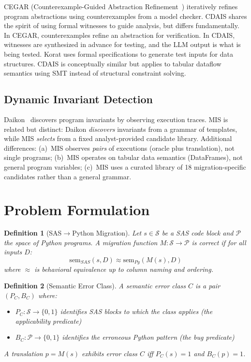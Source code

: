 \documentclass[conference]{IEEEtran}
\newtheorem{definition}{Definition}
\begin{document}
CEGAR (Counterexample-Guided Abstraction Refinement~\cite{cegar}) iteratively refines
program abstractions using counterexamples from a model checker. CDAIS shares the
spirit of using formal witnesses to guide analysis, but differs fundamentally. In
CEGAR, counterexamples refine an abstraction for verification. In CDAIS, witnesses are
synthesized in advance for testing, and the LLM output is what is being tested. Korat
\cite{korat} uses formal specifications to generate test inputs for data structures.
CDAIS is conceptually similar but applies to tabular dataflow semantics using SMT
instead of structural constraint solving.

\subsection{Dynamic Invariant Detection}

Daikon~\cite{daikon} discovers program invariants by observing execution traces. MIS
is related but distinct: Daikon \emph{discovers} invariants from a grammar of
templates, while MIS \emph{selects} from a fixed analyst-provided candidate library.
Additional differences: (a)~MIS observes \emph{pairs} of executions (oracle plus
translation), not single programs; (b)~MIS operates on tabular data semantics
(DataFrames), not general program variables; (c)~MIS uses a curated library of 18
migration-specific candidates rather than a general grammar.


\section{Problem Formulation}

\begin{definition}[SAS$\rightarrow$Python Migration]
Let $s \in \mathcal{S}$ be a SAS code block and $\mathcal{P}$ the space of Python
programs. A migration function $M: \mathcal{S} \to \mathcal{P}$ is \emph{correct} if
for all inputs $D$:
\[
  \text{sem}_{SAS}(s, D) \approx \text{sem}_{Py}(M(s), D)
\]
where $\approx$ is behavioral equivalence up to column naming and ordering.
\end{definition}

\begin{definition}[Semantic Error Class]
A semantic error class $C$ is a pair $(P_C, B_C)$ where:
\begin{itemize}
  \item $P_C: \mathcal{S} \to \{0,1\}$ identifies SAS blocks to which the class
        applies (the \emph{applicability predicate})
  \item $B_C: \mathcal{P} \to \{0,1\}$ identifies the erroneous Python pattern
        (the \emph{bug predicate})
\end{itemize}
A translation $p = M(s)$ exhibits error class $C$ iff $P_C(s) = 1$ and $B_C(p) = 1$.
\end{definition}
\end{document}
